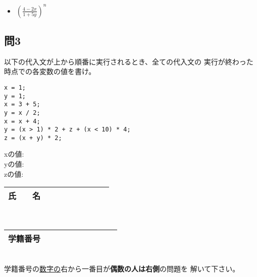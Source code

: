 \documentclass[a4j]{jarticle}
\def\ds{\displaystyle}
\begin{document}
\begin{multicols*}{2}
\begin{itemize}
       \quad \rule[-3ex]{0pt}{6ex}
       \quad {}

       \quad \rule[-3ex]{0pt}{6ex}


 \item $\left(\ds\frac{4-2x}{1+5y}\right)^n$

      \quad \rule[-3ex]{0pt}{6ex}

\end{itemize}





\subsection*{問3}

以下の代入文が上から順番に実行されるとき、全ての代入文の
実行が終わった時点での各変数の値を書け。

\begin{verbatim}
x = 1;
y = 1;
x = 3 + 5;
y = x / 2;
x = x + 4;
y = (x > 1) * 2 + z + (x < 10) * 4;
z = (x + y) * 2;
\end{verbatim}


{\ttfamily x}の値:\\

{\ttfamily y}の値:\\

{\ttfamily z}の値:\\





\vfill







\noindent
\begin{tabular}[t]{|c|cccccccc|}\hline
氏　　名 & & & & & & & & \\ \hline
\end{tabular}\\
\begin{tabular}[t]{|c|c|c|c|c|c|c|c|c|c|}\hline
学籍番号 & & & & & & & & \\ \hline
\end{tabular}\\
学籍番号の\underline{数字の}右から一番目が{\bfseries 偶数の人は右側}の問題を
解いて下さい。
\vspace{-5ex}






\end{multicols*}
\end{document}
